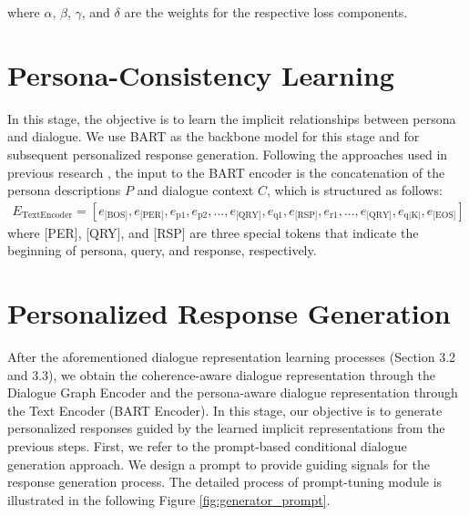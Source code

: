 where \(\alpha\), \(\beta\), \(\gamma\), and \(\delta\) are the weights for the respective loss components.

\section{Persona-Consistency Learning}
In this stage, the objective is to learn the implicit relationships between persona and dialogue. We use BART \cite{lewis-etal-2020-bart} as the backbone model for this stage and for subsequent personalized response generation. Following the approaches used in previous research \cite{chen-etal-2023-memorize}, the input to the BART encoder is the concatenation of the persona descriptions $P$ and dialogue context $C$, which is structured as follows:
\begin{align*}
    E_{\text{TextEncoder}} = [e_{\text{[BOS]}}, e_{\text{[PER]}}, e_{\text{p1}}, e_{\text{p2}}, ... , e_{\text{[QRY]}}, e_{\text{q1}}, e_{\text{[RSP]}}, e_{\text{r1}}, ... , e_{\text{[QRY]}}, e_{\text{q|K|}}, e_{\text{[EOS]}}]
\end{align*}
where [PER], [QRY], and [RSP] are three special tokens that indicate the beginning of persona, query, and response, respectively.

\section{Personalized Response Generation}
After the aforementioned dialogue representation learning processes (Section 3.2 and 3.3), we obtain the coherence-aware dialogue representation through the Dialogue Graph Encoder and the persona-aware dialogue representation through the Text Encoder (BART Encoder). In this stage, our objective is to generate personalized responses guided by the learned implicit representations from the previous steps. First, we refer to the prompt-based conditional dialogue generation approach. We design a prompt to provide guiding signals for the response generation process. The detailed process of prompt-tuning module is illustrated in the following Figure \ref{fig:generator_prompt}.

